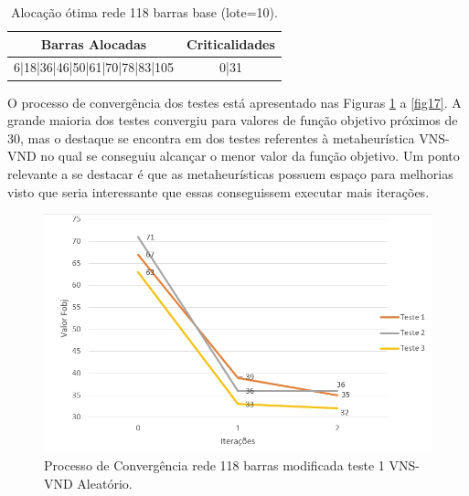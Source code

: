 \documentclass[12pt]{article}
\begin{document}
\begin{table}[H]
	\centering
	\caption{Alocação ótima rede 118 barras base (lote=10).}
	\begin{tabular}{|l|c|}
		\hline
		\multicolumn{1}{|c|}{\textbf{Barras Alocadas}} & \multicolumn{1}{l|}{\textbf{Criticalidades}} \\
		\hline
		6|18|36|46|50|61|70|78|83|105 & 0|31 \\
		\hline
	\end{tabular}%
	\label{tab24}%
\end{table}%

O processo de convergência dos testes está apresentado nas Figuras \ref{fig14} a \ref{fig17}. A grande maioria dos testes convergiu para valores de função objetivo próximos de 30, mas o destaque se encontra em dos testes referentes à metaheurística VNS-VND no qual se conseguiu alcançar o menor valor da função objetivo. Um ponto relevante a se destacar é que as metaheurísticas possuem espaço para melhorias visto que seria interessante que essas conseguissem executar mais iterações.


\begin{figure}[H]
	\centering 
	\includegraphics[scale=0.7]{figuras/VND_118_1_Aleat.jpg}
	\caption{Processo de Convergência rede 118 barras modificada teste 1 VNS-VND Aleatório.}
	\label{fig14} %
\end{figure}
\end{document}
